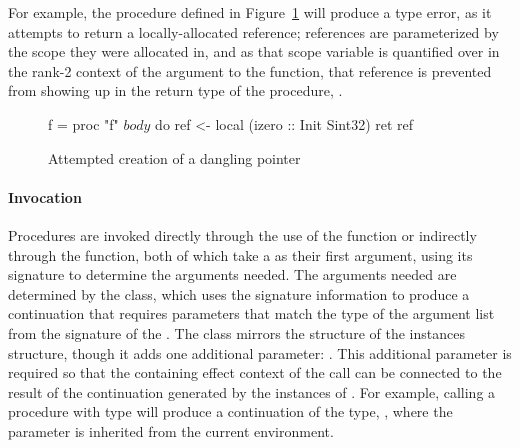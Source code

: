 For example, the procedure  defined in Figure~\ref{fig:proc-def} will
produce a type error, as it attempts to return a locally-allocated reference;
references are parameterized by the scope they were allocated in, and as that
scope variable is quantified over in the rank-2 context of the argument to the
 function, that reference is prevented from showing up in the return
type of the procedure, .

\begin{figure}[ht]
\begin{code}
f = proc "f" $ body $ do
  ref <- local (izero :: Init Sint32)
  ret ref
\end{code}
\caption{Attempted creation of a dangling pointer}
\label{fig:proc-def}
\end{figure}

\paragraph{Invocation} Procedures are invoked directly through the use of the
 function or indirectly through the  function, both of which
take a  as their first argument, using its signature to determine the
arguments needed.  The arguments needed are determined by the 
class, which uses the signature information to produce a continuation that
requires parameters that match the type of the argument list from the signature
of the .  The  class mirrors the structure of the
 instances structure, though it adds one additional
parameter: .  This additional parameter is required so that the
containing effect context of the call can be connected to the result of the
continuation generated by the instances of .  For example, calling
a procedure with type  will produce a
continuation of the type, , where the 
parameter is inherited from the current environment.

